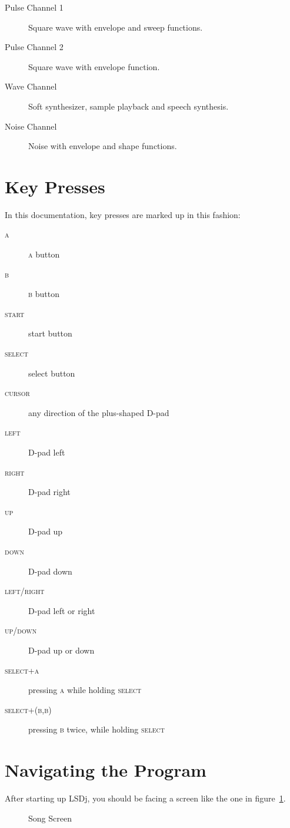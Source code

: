 \begin{description}
\item[Pulse Channel 1] Square wave with envelope and sweep functions.
\item[Pulse Channel 2] Square wave with envelope function.
\item[Wave Channel] Soft synthesizer, sample playback and speech synthesis.
\item[Noise Channel] Noise with envelope and shape functions.
\end{description}


\section{Key Presses}
In this documentation, key presses are marked up in this fashion:
\begin{description}
\item[\textsc{a}] \textsc{a} button
\item[\textsc{b}] \textsc{b} button
\item[\textsc{start}] start button
\item[\textsc{select}] select button
\item[\textsc{cursor}] any direction of the plus-shaped D-pad
\item[\textsc{left}] D-pad left
\item[\textsc{right}] D-pad right
\item[\textsc{up}] D-pad up
\item[\textsc{down}] D-pad down
\item[\textsc{left/right}] D-pad left or right
\item[\textsc{up/down}] D-pad up or down
\item[\textsc{select+a}] pressing \textsc{a} while holding \textsc{select}
\item[\textsc{select+(b,b)}] pressing \textsc{b} twice, while holding \textsc{select}
\end{description}

\section{Navigating the Program}
After starting up LSDj, you should be facing a screen like the one in figure~\ref{fig:song}.

\begin{figure}[hbtp]
\centering
{}
\caption{Song Screen}
\label{fig:song}
\end{figure}

